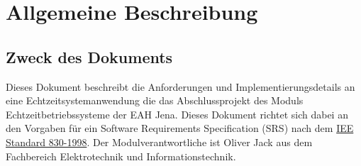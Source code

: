 \section{Allgemeine Beschreibung}
\subsection{Zweck des Dokuments}
Dieses Dokument beschreibt die Anforderungen und Implementierungsdetails an eine Echtzeitsystemanwendung die das Abschlussprojekt des Moduls Echtzeitbetriebssysteme der EAH Jena. Dieses Dokument richtet sich dabei an den Vorgaben für ein Software Requirements Specification (SRS) nach dem \href{https://de.wikipedia.org/wiki/Software_Requirements_Specification}{IEE Standard 830-1998}. Der Modulverantwortliche ist Oliver Jack aus dem Fachbereich Elektrotechnik und Informationstechnik.